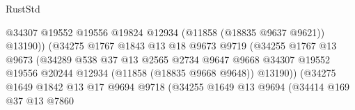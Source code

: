 \begin{lexlean}{RustStd}
\begin{coremodule}
                                              @34307
                                              @19552
                                              @19556
                                              @19824
                                              @12934
                                              (@11858 (@18835 @9637 @9621))
                                              @13190))
                                          (@34275
                                            @1767
                                            @1843
                                            @13
                                            @18
                                            @9673
                                            @9719
                                            (@34255
                                              @1767
                                              @13
                                              @9673
                                              (@34289
                                                @538
                                                @37
                                                @13
                                                @2565
                                                @2734
                                                @9647
                                                @9668
                                                @34307
                                                @19552
                                                @19556
                                                @20244
                                                @12934
                                                (@11858 (@18835 @9668 @9648))
                                                @13190))
                                            (@34275
                                              @1649
                                              @1842
                                              @13
                                              @17
                                              @9694
                                              @9718
                                              (@34255
                                                @1649
                                                @13
                                                @9694
                                                (@34414
                                                  @169
                                                  @37
                                                  @13
                                                  @7860

\end{coremodule}
\end{lexlean}
